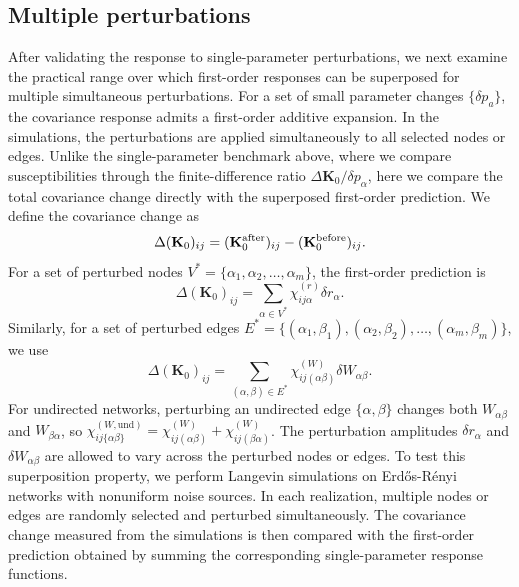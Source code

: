 \subsection{Multiple perturbations}
\quad After validating the response to single-parameter perturbations, we next examine the practical range over which first-order responses can be superposed for multiple simultaneous perturbations. For a set of small parameter changes \(\{\delta p_a\}\), the covariance response admits a first-order additive expansion. In the simulations, the perturbations are applied simultaneously to all selected nodes or edges. Unlike the single-parameter benchmark above, where we compare susceptibilities through the finite-difference ratio \(\Delta \mathbf{K}_0/\delta p_\alpha\), here we compare the total covariance change directly with the superposed first-order prediction. We define the covariance change as
\begin{equation}
    \Delta (\mathbf{K}_0)_{ij} =
    (\mathbf{K}_0^{\rm after})_{ij}-(\mathbf{K}_0^{\rm before})_{ij}.
\end{equation}
For a set of perturbed nodes
\(V^*=\{\alpha_1,\alpha_2,\ldots,\alpha_m\}\), the first-order prediction is
\begin{equation}
    \Delta (\mathbf{K}_0)_{ij} = \sum_{\alpha\in V^*}
    \chi^{(r)}_{ij\alpha}\delta r_\alpha .
\end{equation}
Similarly, for a set of perturbed edges \(E^*=\{(\alpha_1,\beta_1),(\alpha_2,\beta_2),\ldots, (\alpha_m,\beta_m)\}\), we use
\begin{equation}
    \Delta (\mathbf{K}_0)_{ij} = \sum_{(\alpha,\beta)\in E^*} \chi^{(W)}_{ij(\alpha\beta)}\delta W_{\alpha\beta}.
\end{equation}
For undirected networks, perturbing an undirected edge $\{\alpha, \beta\}$ changes both $W_{\alpha\beta}$ and $W_{\beta\alpha}$, so $\chi^{(W,\text{und})}_{ij\{\alpha\beta\}} = \chi^{(W)}_{ij(\alpha\beta)}+\chi^{(W)}_{ij(\beta\alpha)}$. The perturbation amplitudes \(\delta r_\alpha\) and \(\delta W_{\alpha\beta}\) are allowed to vary across the perturbed nodes or edges. To test this superposition property, we perform Langevin simulations on Erd\H{o}s-R\'enyi networks with nonuniform noise sources. In each realization, multiple nodes or edges are randomly selected and perturbed simultaneously. The covariance change measured from the simulations is then compared with the first-order prediction obtained by summing the corresponding single-parameter response functions.\par
